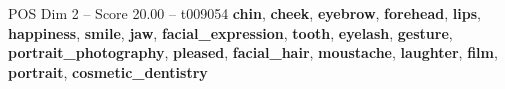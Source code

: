 \begin{textsample}{POS Dim 2 – Score 20.00 – t009054}  \label{ex:f2_pos_033}
\textbf{chin}, \textbf{cheek}, \textbf{eyebrow}, \textbf{forehead}, \textbf{lips}, \textbf{happiness}, \textbf{smile}, \textbf{jaw}, \textbf{facial\_expression}, \textbf{tooth}, \textbf{eyelash}, \textbf{gesture}, \textbf{portrait\_photography}, \textbf{pleased}, \textbf{facial\_hair}, \textbf{moustache}, \textbf{laughter}, \textbf{film}, \textbf{portrait}, \textbf{cosmetic\_dentistry}

\end{textsample}
